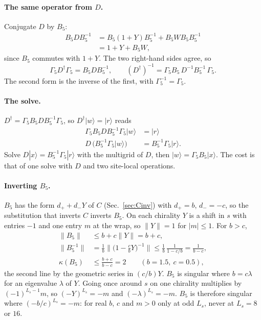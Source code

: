 \documentclass[11pt,a4paper]{article}
\numberwithin{equation}{section}
\newcommand{\dg}{^{\dagger}}
\newcommand{\Gfive}{\Gamma_5}
\begin{document}
\paragraph{The same operator from $D$.} Conjugate $D$ by $B_5$:
\begin{align}
B_5DB_5^{-1}&=B_5(1+Y)B_5^{-1}+B_5WB_5B_5^{-1}\nonumber\\
&=1+Y+B_5W ,
\end{align}
since $B_5$ commutes with $1+Y$. The two right-hand sides agree, so
\begin{equation}
\boxed{\;\Gfive D\dg\Gfive=B_5DB_5^{-1},\qquad(D\dg)^{-1}=\Gfive B_5\,D^{-1}B_5^{-1}\,\Gfive .\;}
\end{equation}
The second form is the inverse of the first, with $\Gfive^{-1}=\Gfive$.

\paragraph{The solve.} $D\dg=\Gfive B_5DB_5^{-1}\Gfive$, so $D\dg|w\rangle=|r\rangle$ reads
\begin{align}
\Gfive B_5DB_5^{-1}\Gfive|w\rangle&=|r\rangle\nonumber\\
D\,\big(B_5^{-1}\Gfive|w\rangle\big)&=B_5^{-1}\Gfive|r\rangle .
\end{align}
Solve $D|x\rangle=B_5^{-1}\Gfive|r\rangle$ with the multigrid of $D$, then
$|w\rangle=\Gfive B_5|x\rangle$. The cost is that of one solve with $D$ and two site-local
operations.

\paragraph{Inverting $B_5$.} $B_5$ has the form $d_++d_-Y$ of $C$ (Sec.~\ref{sec:Cinv}) with
$d_+=b$, $d_-=-c$, so the substitution that inverts $C$ inverts $B_5$. On each chirality $Y$ is a
shift in $s$ with entries $-1$ and one entry $m$ at the wrap, so $\|Y\|=1$ for $|m|\le1$. For $b>c$,
\begin{align}
\|B_5\|&\le b+c\|Y\|=b+c,\nonumber\\
\|B_5^{-1}\|&=\frac1b\Big\|\Big(1-\frac cbY\Big)^{-1}\Big\|\le\frac1b\,\frac1{1-c/b}=\frac1{b-c},
\nonumber\\
\kappa(B_5)&\le\frac{b+c}{b-c}=2\qquad(b=1.5,\ c=0.5),
\end{align}
the second line by the geometric series in $(c/b)Y$. $B_5$ is singular where $b=c\lambda$ for an
eigenvalue $\lambda$ of $Y$. Going once around $s$ on one chirality multiplies by $(-1)^{L_s-1}m$,
so $(-Y)^{L_s}=-m$ and $(-\lambda)^{L_s}=-m$. $B_5$ is therefore singular where
$(-b/c)^{L_s}=-m$: for real $b$, $c$ and $m>0$ only at odd $L_s$, never at $L_s=8$ or $16$.
\end{document}
